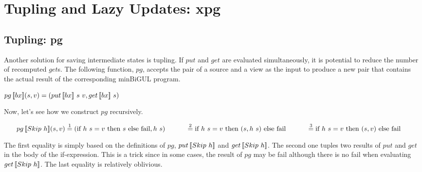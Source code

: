 \section{Tupling and Lazy Updates: xpg} \label{sect:xpg}
\subsection{Tupling: pg}

Another solution for saving intermediate states is tupling. If $put$ and $get$ are evaluated simultaneously, it is potential to reduce the number of recomputed $get$s. The following function, $pg$, accepts the pair of a source and a view as the input to produce a new pair that contains the actual result of the corresponding minBiGUL program.

\begin{definition}
    $pg \, [\![bx]\!] (s, v) = (put \, [\![bx]\!] \ s \ v, get \, [\![bx]\!] \ s)$
\end{definition}



\noindent Now, let's see how we construct $pg$ recursively.

    \noindent $\tabs{2} \pg{Skip \ h}{s}{v} \overset{1}{=} (\sif{h \ s = v}{s}{\text{fail}}, h \ s) \\
        \tab \qtab \overset{2}{=} \sif{h \ s = v}{(s, h \ s)}{\text{fail}} \\
        \tab \qtab \overset{3}{=} \sif{h \ s = v}{(s, v)}{\text{fail}}$

The first equality is simply based on the definitions of $pg$, $put \, [\![Skip \ h]\!]$ and $get \, [\![Skip \ h]\!]$. The second one tuples two results of $put$ and $get$ in the body of the if-expression. This is a trick since in some cases, the result of $pg$ may be fail although there is no fail when evaluating $get \, [\![Skip \ h]\!]$. The last equality is relatively oblivious.

